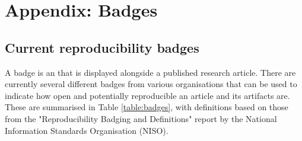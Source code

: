 \section{Appendix: Badges}

\subsection{Current reproducibility badges}

A badge is an that is displayed alongside a published research article. There are currently several different badges from various organisations that can be used to indicate how open and potentially reproducible an article and its artifacts are. These are summarised in Table \ref{table:badges}, with definitions based on those from the "Reproducibility Badging and Definitions" report by the National Information Standards Organisation (NISO).\autocite{niso_reproducibility_badging_and_definitions_working_group_reproducibility_2021}

